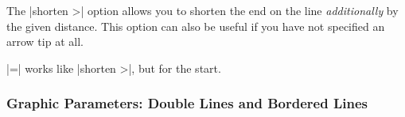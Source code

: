\begin{itemize}
  The |shorten >| option allows you to shorten the end on the line
  \emph{additionally} by the given distance. This option can also be
  useful if you have not specified an arrow tip at all.

\begin{codeexample}[]
\end{codeexample}

  |=| works like |shorten >|,
  but for the start.
\end{itemize}



\subsubsection{Graphic Parameters: Double Lines and Bordered Lines}

